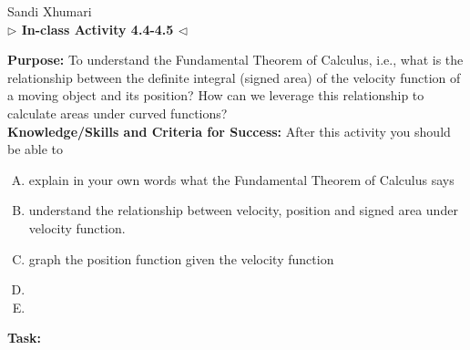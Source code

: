 \documentclass[answers]{exam}
\begin{document}
	\begin{center}
	\hfill Sandi Xhumari \\ \textbf{$\triangleright$ In-class Activity 4.4-4.5 $\triangleleft$}\\
\end{center}

\textbf{Purpose:} To understand the Fundamental Theorem of Calculus, i.e., what is the relationship between the definite integral (signed area) of the velocity function of a moving object and its position? How can we leverage this relationship to calculate areas under curved functions?  \\

\textbf{Knowledge/Skills and Criteria for Success:} After this activity you should be able to

\begin{enumerate}[A.]
	\item explain in your own words what the Fundamental Theorem of Calculus says
	\item understand the relationship between velocity, position and signed area under velocity function.
	\item graph the position function given the velocity function
	\item 
	\item 
	
\end{enumerate}

\textbf{Task:}
\end{document}
